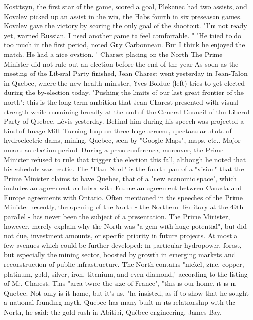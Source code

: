 Kostitsyn, the first star of the game, scored a goal, Plekanec had two assists, and Kovalev picked up an assist in the win, the Habs fourth in six preseason games.
Kovalev gave the victory by scoring the only goal of the shootout.
"I'm not ready yet, warned Russian.
I need another game to feel comfortable. "
"He tried to do too much in the first period, noted Guy Carbonneau.
But I think he enjoyed the match.
He had a nice ovation. "
Charest placing on the North
The Prime Minister did not rule out an election before the end of the year
As soon as the meeting of the Liberal Party finished, Jean Charest went yesterday in Jean-Talon in Quebec, where the new health minister, Yves Bolduc (left) tries to get elected during the by-election today.
"Pushing the limits of our last great frontier of the north": this is the long-term ambition that Jean Charest presented with visual strength while remaining broadly at the end of the General Council of the Liberal Party of Quebec, Lévis yesterday.
Behind him during his speech was projected a kind of Image Mill.
Turning loop on three huge screens, spectacular shots of hydroelectric dams, mining, Quebec, seen by "Google Maps", maps, etc..
Major means as election period.
During a press conference, moreover, the Prime Minister refused to rule that trigger the election this fall, although he noted that his schedule was hectic.
The "Plan Nord" is the fourth pan of a "vision" that the Prime Minister claims to have Quebec, that of a "new economic space", which includes an agreement on labor with France an agreement between Canada and Europe agreements with Ontario.
Often mentioned in the speeches of the Prime Minister recently, the opening of the North - the Northern Territory at the 49th parallel - has never been the subject of a presentation.
The Prime Minister, however, merely explain why the North was "a gem with huge potential", but did not due, investment amounts, or specific priority in future projects.
At most a few avenues which could be further developed: in particular hydropower, forest, but especially the mining sector, boosted by growth in emerging markets and reconstruction of public infrastructure.
The North contains "nickel, zinc, copper, platinum, gold, silver, iron, titanium, and even diamond," according to the listing of Mr. Charest.
This "area twice the size of France", "this is our home, it is in Quebec.
Not only is it home, but it's us, "he insisted, as if to show that he sought a national founding myth.
Quebec has many built in its relationship with the North, he said: the gold rush in Abitibi, Québec engineering, James Bay.
